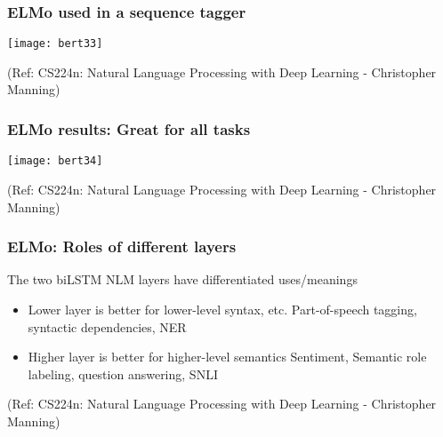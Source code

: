\begin{frame}[fragile]\frametitle{ELMo used in a sequence tagger}

\begin{center}
\texttt{[image: bert33]}
\end{center}	

{\tiny (Ref: CS224n: Natural Language Processing with Deep Learning - Christopher Manning)}

\end{frame}

\begin{frame}[fragile]\frametitle{ELMo results: Great for all tasks}

\begin{center}
\texttt{[image: bert34]}
\end{center}	

{\tiny (Ref: CS224n: Natural Language Processing with Deep Learning - Christopher Manning)}

\end{frame}

\begin{frame}[fragile]\frametitle{ELMo: Roles of different layers}

The two biLSTM NLM layers have differentiated uses/meanings

\begin{itemize}
\item Lower layer is better for lower-level syntax, etc.
Part-of-speech tagging, syntactic dependencies, NER
\item Higher layer is better for higher-level semantics
Sentiment, Semantic role labeling, question answering, SNLI

\end{itemize}


{\tiny (Ref: CS224n: Natural Language Processing with Deep Learning - Christopher Manning)}

\end{frame}

